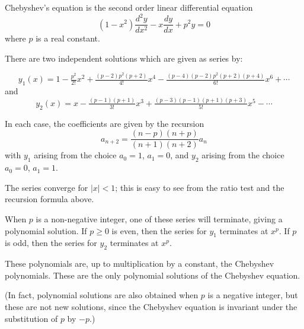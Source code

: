 \documentclass[12pt]{article}
\begin{document}
Chebyshev's equation is the second order linear differential equation
$$(1-x^2)\frac{d^2y}{dx^2} - x\frac{dy}{dx} + p^2y = 0$$
where $p$ is a real constant.

There are two independent solutions which are given as series by:

$$
y_1(x) = 1 - \tfrac{p^2}{2!}x^2 + \tfrac{(p-2)p^2(p+2)}{4!}x^4
      - \tfrac{(p-4)(p-2)p^2(p+2)(p+4)}{6!}x^6 + \dotsb
$$
and
$$
y_2(x) = x - \tfrac{(p-1)(p+1)}{3!}x^3 + \tfrac{(p-3)(p-1)(p+1)(p+3)}{5!}x^5 - \dotsb
$$

In each case, the coefficients are given by the recursion
$$
a_{n+2} = \frac{(n-p)(n+p)}{(n+1)(n+2)} a_n
$$
with $y_1$ arising from the choice $a_0 = 1$, $a_1 = 0$,
and $y_2$ arising from the choice $a_0 = 0$, $a_1 = 1$.

The series converge for $|x| < 1$; this is easy to see from the ratio test and the recursion formula above.

When $p$ is a non-negative integer, one of these series will terminate,
giving a polynomial solution.
If $p \ge 0$ is even, then the series for $y_1$ terminates at $x^p$.
If $p$ is odd, then the series for $y_2$ terminates at $x^p$.

These polynomials are, up to multiplication by a constant, the Chebyshev polynomials.  These are the only polynomial solutions of the Chebyshev equation.

(In fact, polynomial solutions are also obtained when $p$ is a negative integer,
but these are not new solutions, since the Chebyshev equation is invariant under the substitution of $p$ by $-p$.)
\end{document}
